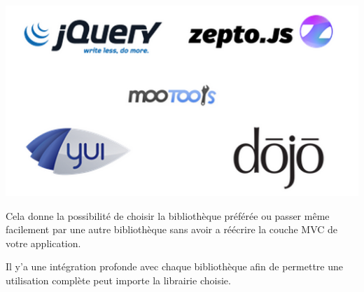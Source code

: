 \begin{center}
\includegraphics[scale=0.5]{img/CanJSlibraries.png}
\label{Graphique bibliothèque CanJS}
\end{center}

Cela donne la possibilité de choisir la bibliothèque préférée ou passer même facilement par une autre bibliothèque sans avoir a réécrire la couche MVC de votre application.

Il y’a une intégration profonde avec chaque bibliothèque afin de permettre une utilisation complète peut importe la librairie choisie.